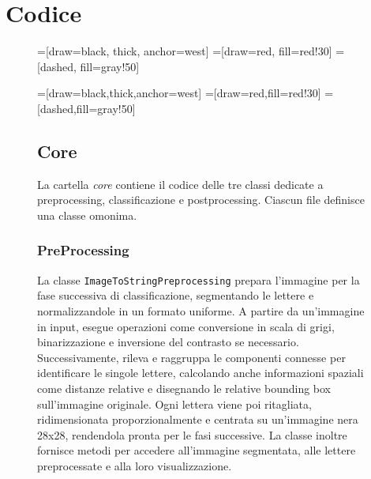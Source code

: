 \chapter{Codice}
\begin{figure}[H]
    \centering
    =[draw=black, thick, anchor=west]
    =[draw=red, fill=red!30]
    =[dashed, fill=gray!50]

=[draw=black,thick,anchor=west]
=[draw=red,fill=red!30]
=[dashed,fill=gray!50]

\section{Core}
La cartella \emph{core} contiene il codice delle tre classi dedicate a preprocessing, classificazione e postprocessing. Ciascun file definisce una classe omonima.

\subsection*{PreProcessing}
La classe \texttt{ImageToStringPreprocessing} prepara l'immagine per la fase successiva di classificazione, segmentando le lettere e normalizzandole in un formato uniforme. A partire da un'immagine in input, esegue operazioni come conversione in scala di grigi, binarizzazione e inversione del contrasto se necessario. 
Successivamente, rileva e raggruppa le componenti connesse per identificare le singole lettere, calcolando anche informazioni spaziali come distanze relative e disegnando le relative bounding box sull'immagine originale.
Ogni lettera viene poi ritagliata, ridimensionata proporzionalmente e centrata su un'immagine nera 28x28, rendendola pronta per le fasi successive. La classe inoltre fornisce metodi per accedere all'immagine segmentata, alle lettere preprocessate e alla loro visualizzazione.



\end{figure}
